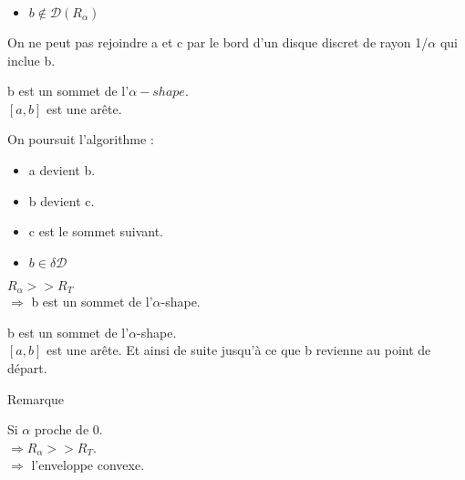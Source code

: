 \documentclass{beamer}
\begin{document}
\begin{frame}
\begin{columns}[t]
\begin{column}{3cm}
\begin{block}{}
{        }
        {
          \begin{itemize}
            \item $b \notin \mathcal{D} \left( R_{\alpha} \right)$
          \end{itemize}
          On ne peut pas rejoindre a et c par le bord d'un disque discret de rayon 1/$\alpha$ qui inclue b.
        }
        {
          b est un sommet de l'$\alpha-shape$.\\
          $[a, b]$ est une arête.
        }
        {
          On poursuit l'algorithme :\\
          \begin{itemize}
            \item a devient b.
            \item b devient c.
            \item c est le sommet suivant.
          \end{itemize}
        }
        {
          \begin{itemize}
            \item $b \in \delta \mathcal{D}$
          \end{itemize}
          $R_{\alpha} >> R_T$\\
          $\Rightarrow$ b est un sommet de l'$\alpha$-shape.\\
          
        }
        {
          b est un sommet de l'$\alpha$-shape.\\
          $[a, b]$ est une arête.
        }
        {
          Et ainsi de suite jusqu'à ce que b revienne au point de départ.\\
        }
      \end{block}
      {
        \begin{block}{Remarque}
        
          \alert{Si $\alpha$ proche de 0.}\\
          \alert{$\Rightarrow R_{\alpha} >> R_T$.}\\
          \alert{$\Rightarrow$ l'enveloppe convexe.}\\

        \end{block} 
      }  
    \end{column}
  \end{columns} 

\end{frame}
\end{document}
